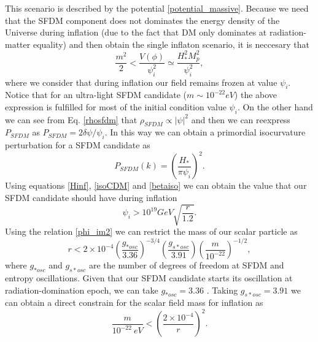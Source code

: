 \documentclass[amssymb,twocolumn,prd,nofootinbib,showpacs]{revtex4-1}
\begin{document}
This scenario is described by the potential \eqref{potential_massive}. Because we need that the SFDM component does not dominates the energy density of the Universe during inflation (due to the fact that DM only dominates at radiation-matter equality) and then obtain the single inflaton scenario, it is neccesary that 
\begin{equation}
\frac{m^2}{2} < \frac{V(\phi)}{\psi_i^2}\simeq \frac{H^2_{*}M_p^2}{\psi_i^2},
\end{equation}
where we consider that during inflation our field remains frozen  at value $\psi_i$. Notice that for an ultra-light SFDM candidate  ($m\sim 10^{-22}eV$) the above expression is fulfilled for most of the initial condition value $\psi_i$. On the other hand we can see from Eq. \eqref{rhosfdm} that $\rho_{SFDM}\propto |\psi|^2$ and then we can reexpress $P_{SFDM}$ as 
$P_{SFDM} = 2\delta \psi/\psi_i
$. In this way we can obtain a primordial isocurvature perturbation for a SFDM candidate as
\begin{equation}
P_{SFDM}(k)=\left(\frac{H_*}{\pi \psi_i}\right)^2.
\end{equation}
Using equations  \eqref{Hinf}, \eqref{isoCDM} and \eqref{betaiso} we can obtain the value that our SFDM candidate should have during inflation
\begin{equation}\label{initial_c}
\psi_i>10^{19}GeV\sqrt{\frac{r}{1.2}}.
\end{equation}
Using the relation \eqref{phi_im2} we can restrict the mass of our scalar particle as  
\begin{equation}
r<2\times 10^{-4}\left(\frac{g_{*osc}}{3.36}\right)^{-3/4}\left(\frac{g_{s*osc}}{3.91}\right)\left(\frac{m}{10^{-22}}\right)^{-1/2},
\end{equation}
where $g_{*osc}$ and $g_{s*osc}$ are the number of degrees of freedom at SFDM and entropy oscillations. Given that our SFDM candidate starts its oscillation at radiation-domination epoch, we can take $g_{*osc}=3.36$ \cite{effdeg}. Taking $g_{s*osc}=3.91$ we can obtain a direct constrain for the scalar field mass for inflation as 
\begin{equation}\label{constm}
\frac{m}{10^{-22}\ eV}<\left(\frac{2\times 10^{-4}}{r}\right)^2.
\end{equation}
\end{document}
